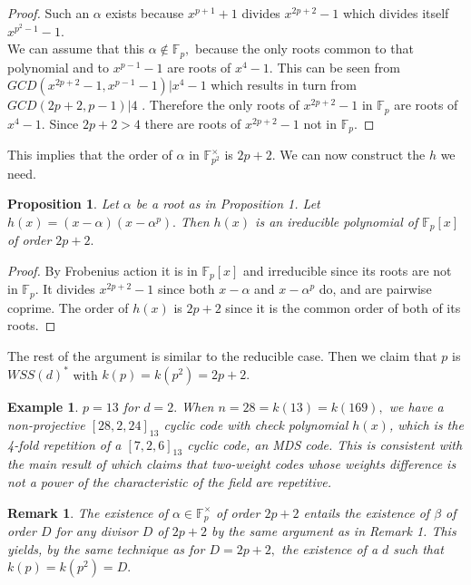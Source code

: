 \documentclass[12pt,reqno]{amsart}
\newtheorem{prop}{Proposition}
\newtheorem{rem}{Remark}
\newtheorem{ex}{Example}
\newcommand{\F}{\mathbb{F}}
\begin{document}
\begin{proof}
 Such an $\alpha$ exists because $x^{p+1}+1$
divides $x^{2p+2}-1$ which divides itself
$x^{p^2-1}-1$.\\ We can assume that this $\alpha \notin \F_p,$ because the only roots common to that polynomial and to $x^{p-1}-1$ are roots of $x^4-1.$
 This can be seen from $GCD(x^{2p+2}-1,x^{p-1}-1)|x^4-1$ which results in turn from $GCD(2p+2,p-1)| 4$ . Therefore the only roots of
 $x^{2p+2}-1$ in $\F_p$ are roots of $x^4-1.$ Since $2p+2>4$  there are roots of $x^{2p+2}-1$ not in $\F_p.$
\end{proof}

This implies that the order of $\alpha$ in $\F_{p^2}^\times$ is $2p+2.$ We can now construct the $h$ we need.

\begin{prop} \label{prop-order-2p+2}
 Let $\alpha$ be a root as in Proposition 1.
 Let $h(x)=(x-\alpha)(x-\alpha^p).$ Then $h(x)$
 is an ireducible polynomial of
 $ \F_p[x]$ of order $2p+2.$
\end{prop}


 \begin{proof}
  By Frobenius action it is in $\F_p[x]$ and irreducible since its roots are not in $\F_p.$
 It divides $x^{2p+2}-1$ since both $x-\alpha$
 and $x-\alpha^p$ do, and are pairwise coprime.
 The order of $h(x)$ is $2p+2$ since it is the common order of both of its roots.
 \end{proof}



 The rest of the argument is similar to the reducible case. Then we claim that $p$ is $WSS(d)^*$ with $k(p)=k(p^2)=2p+2.$

\begin{ex}{\rm
 $p=13$ for $d=2.$ When $n=28=k(13)=k(169),$ we have a non-projective $[28, 2, 24]_{13}$ cyclic code with check polynomial $h(x)$, which is the 4-fold repetition of a $[7,2,6]_{13}$ cyclic code, an MDS code. This
 is consistent with the main result of \cite{K} which claims that two-weight codes whose weights difference is not a power of the characteristic of the field are repetitive.
}
\end{ex}

\begin{rem}{\rm
 The existence of $\alpha \in \F_p^\times$ of order $2p+2$
 entails the existence of $\beta $ of order $D$ for any divisor $D$ of $2p+2$ by the same argument as in Remark 1. This yields, by the same technique as for $D=2p+2,$ the existence
 of a $d$ such that $k(p)=k(p^2)=D.$
 }
\end{rem}
\end{document}
